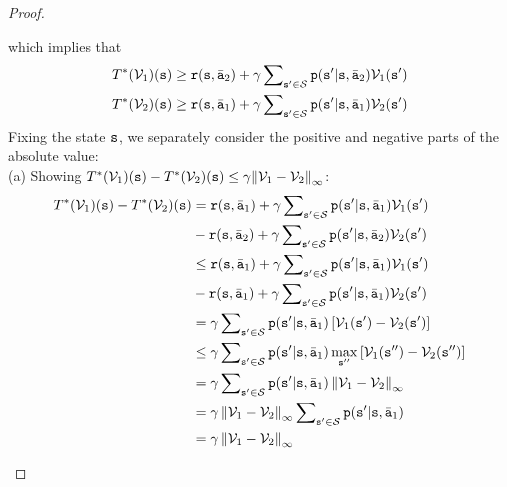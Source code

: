 \begin{proof}
\begin{enumerate}
which implies that
\begin{align*}
T^{*}({\mathcal{V}_{1}})({\tt s}) & \geq{\tt r}({\tt s},\bar{{\tt a}}_{2})+\gamma\sum\nolimits _{{\tt s}'\in\mathcal{S}}{{\tt p}({\tt s}'|{\tt s},\bar{{\tt a}}_{2}){\mathcal{V}_{1}}({\tt s}')}\\
T^{*}({\mathcal{V}_{2}})({\tt s}) & \geq{\tt r}({\tt s},\bar{{\tt a}}_{1})+\gamma\sum\nolimits _{{\tt s}'\in\mathcal{S}}{{\tt p}({\tt s}'|{\tt s},\bar{{\tt a}}_{1}){\mathcal{V}_{2}}({\tt s}')}
\end{align*}
Fixing the state ${\tt s}$, we separately consider the positive and negative parts of the absolute value:\\
(a) Showing $T_{}^*({\mathcal{V}_1})({\tt s}) - T_{}^*({\mathcal{V}_2})({\tt s})
\le \gamma {\left\| {{\mathcal{V}_1} - {\mathcal{V}_2}} \right\|_\infty }$:
\begin{align*}
T^{*}({\Value_{1}})(\state)-T^{*}({\Value_{2}})(\state) & =\reward(\state,\bar{\action}_{1})+\discount\sum\nolimits _{\state'\in\States}{\transitionprob(\state'|\state,\bar{\action}_{1}){\Value_{1}}(\state')}\\
 & -\reward(\state,\bar{\action}_{2})+\discount\sum\nolimits _{\state'\in\States}{\transitionprob(\state'|\state,\bar{\action}_{2}){\Value_{2}}(\state')}\\
 & \leq\reward(\state,\bar{\action}_{1})+\discount\sum\nolimits _{\state'\in\States}{\transitionprob(\state'|\state,\bar{\action}_{1}){\Value_{1}}(\state')}\\
 & -\reward(\state,\bar{\action}_{1})+\discount\sum\nolimits _{\state'\in\States}{\transitionprob(\state'|\state,\bar{\action}_{1}){\Value_{2}}(\state')}\\
 & =\discount\sum\nolimits _{\state'\in\States}{\transitionprob(\state'|\state,\bar{\action}_{1})\left[{\Value_{1}}(\state')-{\Value_{2}}(\state')\right]}\\
 & \leq\discount\sum\nolimits _{\state'\in\States}{\transitionprob(\state'|\state,\bar{\action}_{1})\max_{\state''}\left[{\Value_{1}}(\state'')-{\Value_{2}}(\state'')\right]}\\
 & =\discount\sum\nolimits _{\state'\in\States}{\transitionprob(\state'|\state,\bar{\action}_{1})\left\Vert {\Value_{1}}-{\Value_{2}}\right\Vert _{\infty}}\\
 & =\discount\left\Vert {\Value_{1}}-{\Value_{2}}\right\Vert _{\infty}\sum\nolimits _{\state'\in\States}{\transitionprob(\state'|\state,\bar{\action}_{1})}\\
 & =\discount\left\Vert {\Value_{1}}-{\Value_{2}}\right\Vert _{\infty}

\end{align*}
\end{enumerate}
\end{proof}
